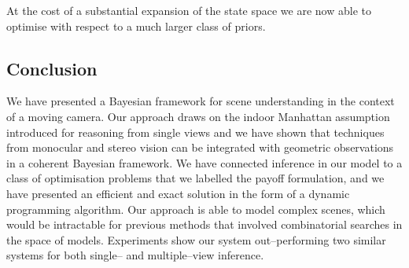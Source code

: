 At the cost of a substantial expansion of the state space we are
now able to optimise with respect to a much larger class of priors.














\subsection{Conclusion}
We have presented a Bayesian framework for scene understanding in the
context of a moving camera. Our approach draws on the indoor Manhattan
assumption introduced for reasoning from single views and we have
shown that techniques from monocular and stereo vision can be
integrated with geometric observations in a coherent Bayesian
framework. We have connected inference in our model to a class of
optimisation problems that we labelled the payoff formulation, and we
have presented an efficient and exact solution in the form of a
dynamic programming algorithm. Our approach is able to model complex
scenes, which would be intractable for previous methods that involved
combinatorial searches in the space of models. Experiments show
our system out--performing two similar systems for both single-- and
multiple--view inference.
